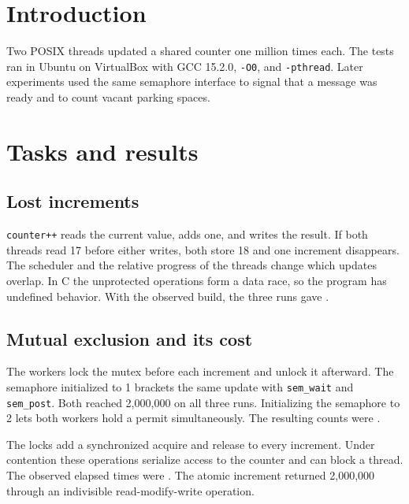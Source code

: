 \chapter{Introduction}

Two POSIX threads updated a shared counter one million times each. The tests ran in Ubuntu on VirtualBox with GCC 15.2.0, \texttt{-O0}, and \texttt{-pthread}. Later experiments used the same semaphore interface to signal that a message was ready and to count vacant parking spaces.

\chapter{Tasks and results}

\section{Lost increments}

\texttt{counter++} reads the current value, adds one, and writes the result. If both threads read 17 before either writes, both store 18 and one increment disappears. The scheduler and the relative progress of the threads change which updates overlap. In C the unprotected operations form a data race, so the program has undefined behavior. With the observed build, the three runs gave \RaceResults.


\clearpage
\section{Mutual exclusion and its cost}

The workers lock the mutex before each increment and unlock it afterward. The semaphore initialized to 1 brackets the same update with \texttt{sem\_wait} and \texttt{sem\_post}. Both reached 2,000,000 on all three runs. Initializing the semaphore to 2 lets both workers hold a permit simultaneously. The resulting counts were \TwoPermitResults.


The locks add a synchronized acquire and release to every increment. Under contention these operations serialize access to the counter and can block a thread. The observed elapsed times were \CounterTimes. The atomic increment returned 2,000,000 through an indivisible read-modify-write operation.

